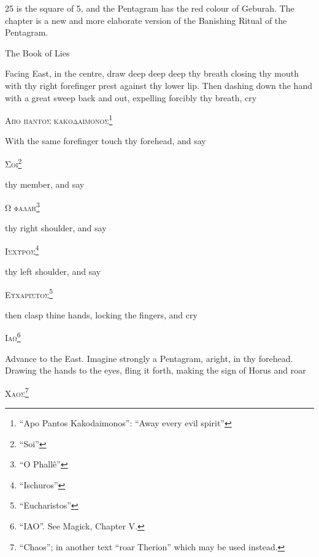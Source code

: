 
\epigraph{25 is the square of 5, and the Pentagram has the red colour of Geburah. The chapter is a new and more elaborate version of the Banishing Ritual of the Pentagram.}{The Book of Lies}


Facing East, in the centre, draw deep deep deep thy breath closing thy mouth with thy right forefinger prest against thy lower lip. Then dashing down the hand with a great sweep back and out, expelling forcibly thy breath, cry


\begin{quoting}[indentfirst=false]
\textsc{Απο παντος κακοδαιμονος}\footnote{\enquote{Apo Pantos Kakodaimonos}: \enquote{Away every evil spirit}}
\end{quoting}

With the same forefinger touch thy forehead, and say
\begin{quoting}[indentfirst=false]
\textsc{Σοι}\footnote{\enquote{Soi}}
\end{quoting}

thy member, and say
\begin{quoting}[indentfirst=false]
\textsc{Ω φαλλη}\footnote{\enquote{O Phall\^e}}
\end{quoting}

thy right shoulder, and say
\begin{quoting}[indentfirst=false]
\textsc{Ισχυροσ}\footnote{\enquote{Ischuros}}
\end{quoting}

thy left shoulder, and say
\begin{quoting}[indentfirst=false]
\textsc{Ευχαριστοσ}\footnote{\enquote{Eucharistos}}
\end{quoting}

then clasp thine hands, locking the fingers, and cry
\begin{quoting}[indentfirst=false]
\textsc{Ιαω}\footnote{\enquote{IAO}. See Magick, Chapter V.}
\end{quoting}

Advance to the East. Imagine strongly a Pentagram, aright, in thy forehead. Drawing the hands to the eyes, fling it forth, making the sign of Horus and roar
\begin{quoting}[indentfirst=false]
\textsc{Χαοσ}\footnote{\enquote{Chaos}; in another text \enquote{roar Therion} which may be used instead.}
\end{quoting}

